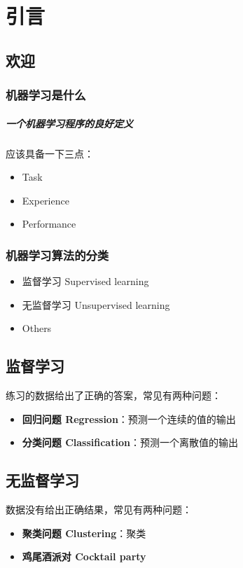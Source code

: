 \documentclass[../main.tex]{subfiles}
\begin{document}
\chapter{引言}
\section{欢迎}
\subsection{机器学习是什么}

\paragraph{一个机器学习程序的良好定义}应该具备一下三点：\begin{itemize}
    \item Task
    \item Experience
    \item Performance
\end{itemize}

\subsection{机器学习算法的分类}
\begin{itemize}
    \item 监督学习 Supervised learning
    \item 无监督学习 Unsupervised learning
    \item Others
\end{itemize}

\section{监督学习}
练习的数据给出了正确的答案，常见有两种问题：

\begin{itemize}
    \item \textbf{回归问题 Regression}：预测一个连续的值的输出
    \item \textbf{分类问题 Classification}：预测一个离散值的输出
\end{itemize}

\section{无监督学习}
数据没有给出正确结果，常见有两种问题：
\begin{itemize}
    \item \textbf{聚类问题 Clustering}：聚类
    \item \textbf{鸡尾酒派对 Cocktail party}
\end{itemize}
\end{document}
